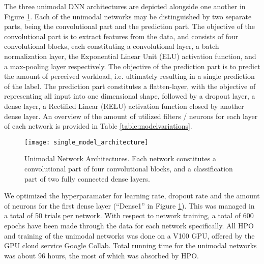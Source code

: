 \documentclass[fleqn,11pt]{paper}
\begin{document}
The three unimodal DNN architectures are depicted alongside one another in Figure \ref{fig:singlearchitecture}. Each of the unimodal networks may be distinguished by two separate parts, being the convolutional part and the prediction part.  The objective of the convolutional part is to extract features from the data, and consists of four convolutional blocks, each constituting a convolutional layer, a batch normalization layer, the Exponential Linear Unit (ELU) activation function, and a max-pooling layer respectively. The objective of the prediction part is to predict the amount of perceived workload,  i.e. ultimately resulting in a single prediction of the label. The prediction part constitutes a flatten-layer,  with the objective of representing all input into one dimensional shape, followed by a dropout layer, a dense layer, a Rectified Linear (RELU) activation function closed by another dense layer. An overview of the amount of utilized filters / neurons for each layer of each network is provided in Table \ref{table:modelvariations}. 

\vspace{7mm}
\begin{figure}[h]
\centering
\texttt{[image: single\_model\_architecture]}
\caption{Unimodal Network Architectures. Each network constitutes a convolutional part of four convolutional blocks, and a classification part of two fully connected dense layers. }\label{fig:singlearchitecture}
\end{figure}

\newpage
We optimized the hyperparamater for learning rate, dropout rate and the amount of neurons for the first dense layer (\enquote{Dense1} in Figure \ref{fig:singlearchitecture}). This was managed in a total of 50 trials per network.  With respect to network training, a total of 600 epochs have been made through the data for each network specifically. All HPO and training of the unimodal networks was done on a V100 GPU,  offered by the GPU cloud service Google Collab.  Total running time for the unimodal networks was about 96 hours, the most of which was absorbed by HPO. 
\end{document}
